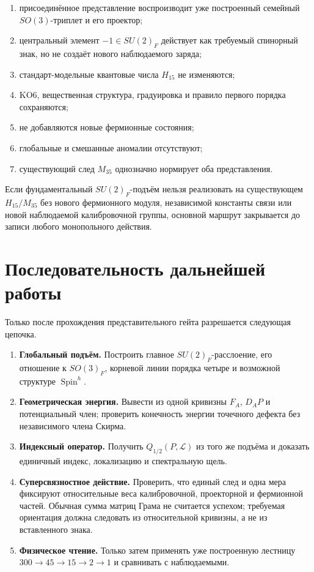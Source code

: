 \begin{enumerate}
 \item присоединённое представление воспроизводит уже построенный семейный
 $SO(3)$-триплет и его проектор;
 \item центральный элемент $-1\in SU(2)_F$ действует как требуемый
 спинорный знак, но не создаёт нового наблюдаемого заряда;
 \item стандарт-модельные квантовые числа $H_{15}$ не изменяются;
 \item KO6, вещественная структура, градуировка и правило первого порядка
 сохраняются;
 \item не добавляются новые фермионные состояния;
 \item глобальные и смешанные аномалии отсутствуют;
 \item существующий след $M_{35}$ однозначно нормирует оба представления.
\end{enumerate}

\begin{nogocriterion}
Если фундаментальный $SU(2)_F$-подъём нельзя реализовать на существующем
$H_{15}/M_{35}$ без нового фермионного модуля, независимой константы связи
или новой наблюдаемой калибровочной группы, основной маршрут закрывается до
записи любого монопольного действия.
\end{nogocriterion}

\section{Последовательность дальнейшей работы}

Только после прохождения представительного гейта разрешается следующая
цепочка.

\begin{enumerate}
 \item \textbf{Глобальный подъём.} Построить главное $SU(2)_F$-расслоение,
 его отношение к $SO(3)_F$, корневой линии порядка четыре и возможной
 структуре $\operatorname{Spin}^h$.
 \item \textbf{Геометрическая энергия.} Вывести из одной кривизны
 $F_A$, $D_AP$ и потенциальный член; проверить конечность энергии
 точечного дефекта без независимого члена Скирма.
 \item \textbf{Индексный оператор.} Получить
 $Q_{1/2}(P,\mathcal L)$ из того же подъёма и доказать единичный индекс,
 локализацию и спектральную щель.
 \item \textbf{Суперсвязностное действие.} Проверить, что единый след и
 одна мера фиксируют относительные веса калибровочной, проекторной и
 фермионной частей. Обычная сумма матриц Грама не считается успехом;
 требуемая ориентация должна следовать из относительной кривизны, а не из
 вставленного знака.
 \item \textbf{Физическое чтение.} Только затем применять уже построенную
 лестницу $300\to45\to15\to2\to1$ и сравнивать с наблюдаемыми.
\end{enumerate}

